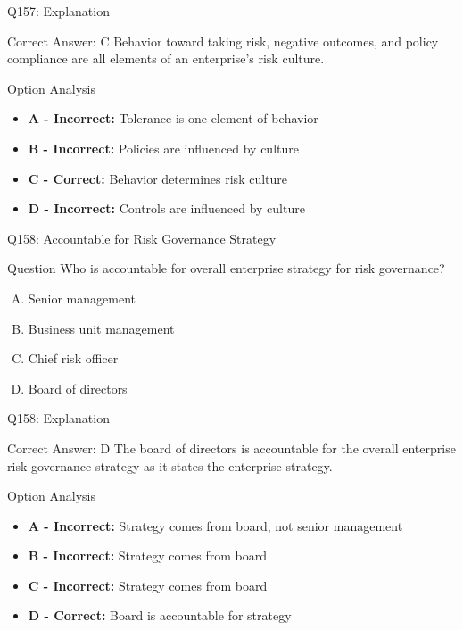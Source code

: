 \documentclass{beamer}
\begin{document}
	\begin{frame}{Q157: Explanation}
		\begin{block}{Correct Answer: C}
			Behavior toward taking risk, negative outcomes, and policy compliance are all elements of an enterprise's risk culture.
		\end{block}
		\begin{block}{Option Analysis}
			\begin{itemize}
				\item \textbf{A - Incorrect:} Tolerance is one element of behavior
				\item \textbf{B - Incorrect:} Policies are influenced by culture
				\item \textbf{C - Correct:} Behavior determines risk culture
				\item \textbf{D - Incorrect:} Controls are influenced by culture
			\end{itemize}
		\end{block}
	\end{frame}
	
	\begin{frame}{Q158: Accountable for Risk Governance Strategy}
		\begin{block}{Question}
			Who is accountable for overall enterprise strategy for risk governance?
		\end{block}
		\begin{enumerate}[(A)]
			\item Senior management
			\item Business unit management
			\item Chief risk officer
			\item Board of directors
		\end{enumerate}
	\end{frame}
	
	\begin{frame}{Q158: Explanation}
		\begin{block}{Correct Answer: D}
			The board of directors is accountable for the overall enterprise risk governance strategy as it states the enterprise strategy.
		\end{block}
		\begin{block}{Option Analysis}
			\begin{itemize}
				\item \textbf{A - Incorrect:} Strategy comes from board, not senior management
				\item \textbf{B - Incorrect:} Strategy comes from board
				\item \textbf{C - Incorrect:} Strategy comes from board
				\item \textbf{D - Correct:} Board is accountable for strategy
			\end{itemize}
		\end{block}
	\end{frame}
	
\end{document}
